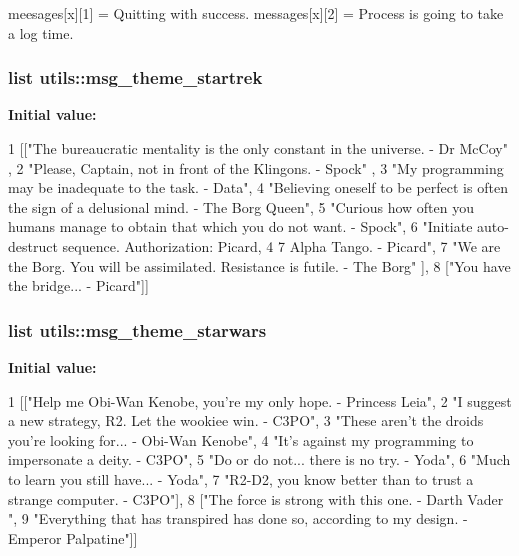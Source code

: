 meesages\mbox{[}x\mbox{]}\mbox{[}1\mbox{]} = \-Quitting with success. messages\mbox{[}x\mbox{]}\mbox{[}2\mbox{]} = \-Process is going to take a log time. \hypertarget{namespaceutils_a539e6ad28cc48419af0d7577e82852ed}{
\subsubsection[{msg\-\_\-theme\-\_\-startrek}]{\setlength{\rightskip}{0pt plus 5cm}list {\bf utils\-::msg\-\_\-theme\-\_\-startrek}}}\label{namespaceutils_a539e6ad28cc48419af0d7577e82852ed}
{\bfseries \-Initial value\-:}
\begin{DoxyCode}
1 [["The bureaucratic mentality is the only constant in the universe. - Dr McCoy"
      ,
2                        "Please, Captain, not in front of the Klingons. - Spock"
      ,
3                        "My programming may be inadequate to the task. - Data",
4                        "Believing oneself to be perfect is often the sign of a
       delusional mind. - The Borg Queen",
5                        "Curious how often you humans manage to obtain that
       which you do not want. - Spock",
6                        "Initiate auto-destruct sequence. Authorization: Picard,
       4 7 Alpha Tango. - Picard",
7                        "We are the Borg. You will be assimilated. Resistance is
       futile. - The Borg" ],
8                       ["You have the bridge... - Picard"]]
\end{DoxyCode}
\hypertarget{namespaceutils_aae71d893a1a1f36409c41ce9f00c39d0}{
\subsubsection[{msg\-\_\-theme\-\_\-starwars}]{\setlength{\rightskip}{0pt plus 5cm}list {\bf utils\-::msg\-\_\-theme\-\_\-starwars}}}\label{namespaceutils_aae71d893a1a1f36409c41ce9f00c39d0}
{\bfseries \-Initial value\-:}
\begin{DoxyCode}
1 [["Help me Obi-Wan Kenobe, you're my only hope. - Princess Leia",
2                        "I suggest a new strategy, R2. Let the wookiee win. -
       C3PO",
3                        "These aren't the droids you're looking for... - Obi-Wan
       Kenobe",
4                        "It's against my programming to impersonate a deity. -
       C3PO",
5                        "Do or do not... there is no try. - Yoda",
6                        "Much to learn you still have... - Yoda",
7                        "R2-D2, you know better than to trust a strange
       computer. - C3PO"],
8                       ["The force is strong with this one. - Darth Vader ",
9                        "Everything that has transpired has done so, according
       to my design. - Emperor Palpatine"]]
\end{DoxyCode}
